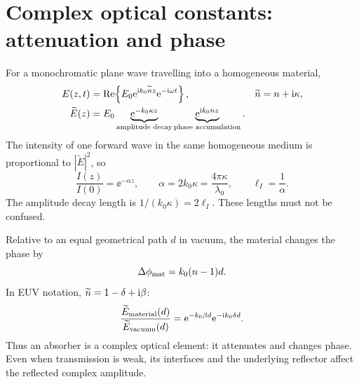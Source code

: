 \section{Complex optical constants: attenuation and phase}
For a monochromatic plane wave travelling into a homogeneous material,
\begin{align}
E(z,t)&=\operatorname{Re}\!\left\{E_0\mathrm{e}^{\mathrm{i} k_0\widetilde n z}\mathrm{e}^{-\mathrm{i}\omega t}\right\},
&\widetilde n&=n+\mathrm{i}\kappa,\\
\widetilde E(z)&=E_0\underbrace{\mathrm{e}^{-k_0\kappa z}}_{\text{amplitude decay}}
\underbrace{\mathrm{e}^{\mathrm{i} k_0nz}}_{\text{phase accumulation}}.
\end{align}
The intensity of one forward wave in the same homogeneous medium is proportional to $|\widetilde E|^2$, so
\begin{equation}
\boxed{\frac{I(z)}{I(0)}=\ee^{-\alpha z},\qquad
\alpha=2k_0\kappa=\frac{4\pi\kappa}{\lambda_0},\qquad
\ell_I=\frac{1}{\alpha}.}
\end{equation}
The amplitude decay length is $1/(k_0\kappa)=2\ell_I$. These lengths must not be confused.

Relative to an equal geometrical path $d$ in vacuum, the material changes the phase by
\begin{equation}
\Delta\phi_{\rm mat}=k_0(n-1)d.
\end{equation}
In EUV notation, $\widetilde n=1-\delta+\mathrm{i}\beta$:
\begin{equation}
\frac{\widetilde E_{\rm material}(d)}{\widetilde E_{\rm vacuum}(d)}
=\mathrm{e}^{-k_0\beta d}\mathrm{e}^{-\mathrm{i} k_0\delta d}.
\end{equation}
Thus an absorber is a complex optical element: it attenuates and changes phase. Even when transmission is weak, its interfaces and the underlying reflector affect the reflected complex amplitude.



